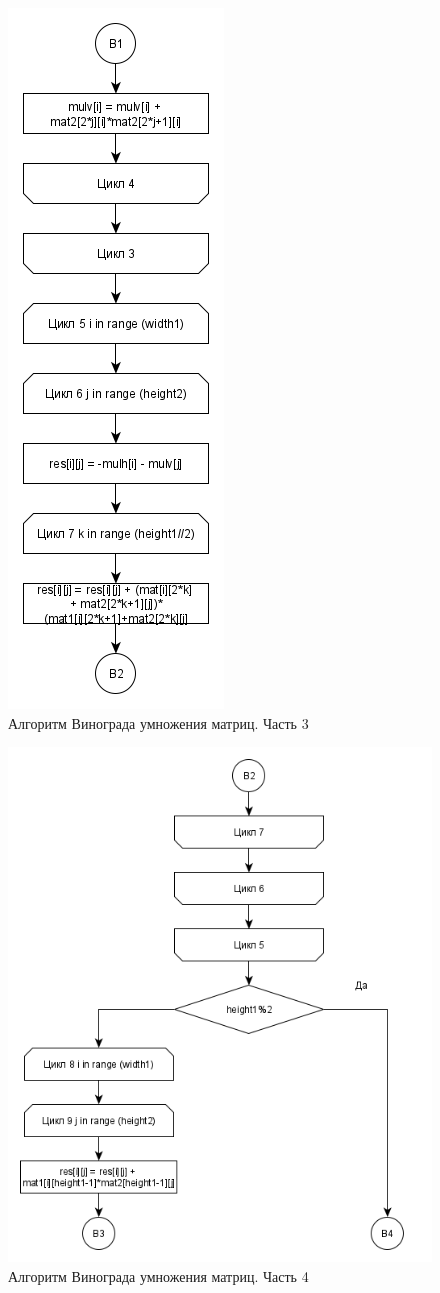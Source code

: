 \documentclass[a4paper,12pt]{report}
\begin{document}
		\begin{figure}[h!]
			\centering
			\includegraphics[width=0.4\linewidth]{part31.png}
			\caption{Алгоритм Винограда умножения матриц. Часть 3}
			\label{ris:wino3}
		\end{figure}
		
		\newpage
		
		\begin{figure}[h!]
			\centering
			\includegraphics[width=0.8\linewidth]{part41.png}
			\caption{Алгоритм Винограда умножения матриц. Часть 4}
			\label{ris:wino4}
		\end{figure}
		
\end{document}
